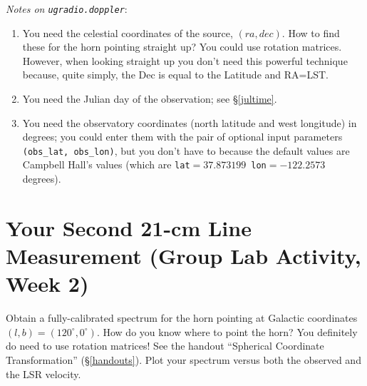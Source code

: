 \documentclass[11pt,preprint]{aastex}
\begin{document}
{\it Notes on \verb$ugradio.doppler$}: \begin{enumerate}

\item You need the celestial coordinates of the source, $(ra, dec)$. How
  to find these for the horn pointing straight up? You could use
  rotation matrices. However, when looking straight up you don't need
  this powerful technique because, quite simply, the Dec is equal to the
  Latitude and RA=LST.

\item You need the Julian day of the observation; see \S \ref{jultime}.

\item You need the observatory coordinates (north latitude and west
  longitude) in degrees; you could enter them with the pair of optional
  input parameters {\tt (obs\_lat, obs\_lon)}, but you don't have to because
  the default values are Campbell Hall's values (which are {\tt lat$=37.873199$
  lon$=-122.2573$} degrees).

\end{enumerate}

\section{Your Second 21-cm Line Measurement (Group Lab Activity, Week 2)}
\label{meas2}

\noindent
Obtain a fully-calibrated spectrum for the horn pointing at Galactic
coordinates $(l,b)=(120^\circ, 0^\circ)$. How do you know where to point
the horn? You definitely do need to use rotation matrices!  See the
handout ``Spherical Coordinate Transformation''
(\S \ref{handouts}). Plot your spectrum versus both the observed and
the LSR velocity. 
\end{document}
